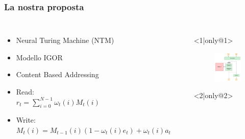 \documentclass{beamer}
\begin{document}
\begin{frame}
\frametitle{La nostra proposta}
\begin{columns}
\begin{itemize} 
\item <1-> Neural Turing Machine (NTM)
\item <2-> Modello IGOR
\item <3-> Content Based Addressing
\item <4-> Read:\\ \footnotesize	 $r_{t}=\sum_{i=0}^{N-1}\omega_{t}(i)M_{t}(i)$
\item <5-> Write:\\ \scriptsize $M_{t}(i)=M_{t-1}(i)(1-\omega_{t}(i)e_{t})+\omega_{t}(i)a_{t}$

\end{itemize}
\begin{itemize}
	\item[] <1|only@1> 
		\begin{figure}[!h]
 			\begin{center}
 			\includegraphics[scale=0.22]{"Immagini/NTM.png"}
 			\end{center}
 		\end{figure}
 	\item[] <2|only@2> 

\end{itemize}
\end{columns}
\end{frame}
\end{document}
